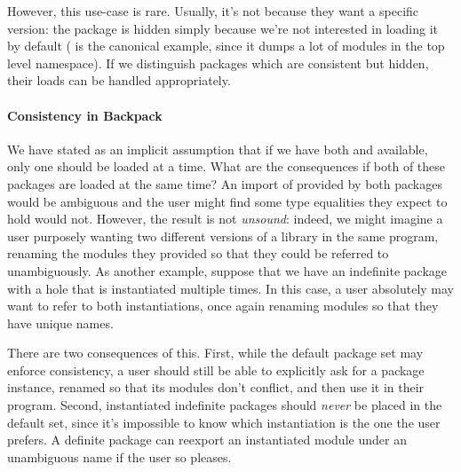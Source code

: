 \documentclass{article}
\begin{document}
However, this use-case is rare.  Usually, it's not because they want a
specific version: the package is hidden simply because we're not
interested in loading it by default ( is the canonical
example, since it dumps a lot of modules in the top level namespace).
If we distinguish packages which are consistent but hidden, their
loads can be handled appropriately.

\paragraph{Consistency in Backpack} We have stated as an implicit
assumption that if we have both  and 
available, only one should be loaded at a time.  What are the
consequences if both of these packages are loaded at the same time?  An
import of  provided by both packages would be ambiguous and
the user might find some type equalities they expect to hold would not.
However, the result is not \emph{unsound}: indeed, we might imagine a
user purposely wanting two different versions of a library in the same
program, renaming the modules they provided so that they could be
referred to unambiguously.  As another example, suppose that we have an
indefinite package with a hole that is instantiated multiple times.  In
this case, a user absolutely may want to refer to both instantiations,
once again renaming modules so that they have unique names.

There are two consequences of this.  First, while the default package
set may enforce consistency, a user should still be able to explicitly
ask for a package instance, renamed so that its modules don't conflict,
and then use it in their program.  Second, instantiated indefinite packages
should \emph{never} be placed in the default set, since it's impossible
to know which instantiation is the one the user prefers.  A definite package
can reexport an instantiated module under an unambiguous name if the user
so pleases.
\end{document}
